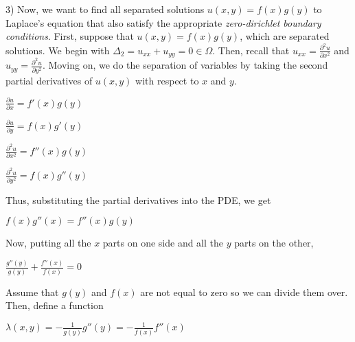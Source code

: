\documentclass[executivepaper]{article}
\begin{document}
\begin{flushleft}

3) Now, we want to find all separated solutions $u(x,y)=f(x)g(y)$ to Laplace's equation that also satisfy the appropriate \textit{zero-dirichlet boundary conditions}. First, suppose that $u(x,y)=f(x)g(y)$, which are separated solutions. We begin with $\Delta_{2}=u_{xx}+u_{yy}=0 \in \Omega$. Then, recall that $u_{xx}=\frac{\partial^2 u}{\partial x^2}$ and $u_{yy}=\frac{\partial^2 u}{\partial y^2}$. Moving on, we do the separation of variables by taking the second partial derivatives of $u(x,y)$ with respect to $x$ and $y$. 

\begin{center}

$\frac{\partial u}{\partial x}=f'(x)g(y)$

\vspace{2mm}

$\frac{\partial u}{\partial y}=f(x)g'(y)$

\vspace{2mm}

$\frac{\partial^2 u}{\partial x^2}=f''(x)g(y)$

\vspace{2mm}

$\frac{\partial^2 u}{\partial y^2}=f(x)g''(y)$

\end{center}

Thus, substituting the partial derivatives into the PDE, we get

\begin{center}

$f(x)g''(x)=f''(x)g(y)$

\end{center}

Now, putting all the $x$ parts on one side and all the $y$ parts on the other,

\begin{center}

$\frac{g''(y)}{g(y)}+\frac{f''(x)}{f(x)}=0$

\end{center}

Assume that $g(y)$ and $f(x)$ are not equal to zero so we can divide them over. Then, define a function

\begin{center}

$\lambda(x,y)=-\frac{1}{g(y)}g''(y)=-\frac{1}{f(x)}f''(x)$

\end{center}


\end{flushleft}
\end{document}
